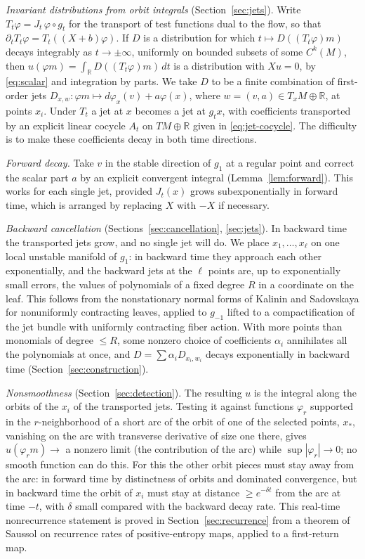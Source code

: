 \documentclass[11pt]{article}
\theoremstyle{remark}
\newcommand{\R}{\mathbb R}
\begin{document}
\emph{Invariant distributions from orbit integrals}
(Section~\ref{sec:jets}).  Write
\(T_t\varphi=J_t\,\varphi\circ g_t\) for the transport of test
functions dual to the flow, so that \(\partial_tT_t\varphi=T_t((X+b)\varphi)\).
If \(D\) is a distribution for which
\(t\mapsto D((T_t\varphi)m)\) decays integrably as \(t\to\pm\infty\),
uniformly on bounded subsets of some \(C^k(M)\), then
\(u(\varphi m)=\int_\R D((T_t\varphi)m)\,dt\) is a distribution with
\(Xu=0\), by \eqref{eq:scalar} and integration by parts.
We take \(D\) to be a finite combination of first-order jets
\(D_{x,w}:\varphi m\mapsto d\varphi_x(v)+a\varphi(x)\), where
\(w=(v,a)\in T_xM\oplus\R\), at points \(x_i\).
Under \(T_t\) a jet at \(x\) becomes a jet at \(g_tx\), with
coefficients transported by an explicit linear cocycle \(A_t\) on
\(TM\oplus\R\) given in \eqref{eq:jet-cocycle}.  The difficulty is
to make these coefficients decay in both time directions.

\emph{Forward decay.}  Take \(v\) in the stable direction of
\(g_1\) at a regular point and correct the scalar part \(a\)
by an explicit convergent integral (Lemma~\ref{lem:forward}).  This
works for each single jet, provided \(J_t(x)\) grows subexponentially
in forward time, which is arranged by replacing \(X\)
with \(-X\) if necessary.

\emph{Backward cancellation} (Sections~\ref{sec:cancellation},
\ref{sec:jets}).  In backward time the transported jets grow, and no
single jet will do.  We place \(x_1,\dots,x_\ell\) on one
local unstable manifold of \(g_1\): in backward time they approach
each other exponentially, and the backward jets at the \(\ell\)
points are, up to exponentially small errors, the values of
polynomials of a fixed degree \(R\) in a coordinate on the
leaf.  This follows from the nonstationary normal forms of
Kalinin and Sadovskaya \cite{KalininSadovskaya2017} for nonuniformly
contracting leaves, applied to \(g_{-1}\) lifted to a
compactification of the jet bundle with uniformly contracting fiber
action.  With more points than monomials of degree
\(\le R\), some nonzero choice of coefficients \(\alpha_i\) annihilates
all the polynomials at once, and \(D=\sum\alpha_iD_{x_i,w_i}\) decays
exponentially in backward time (Section~\ref{sec:construction}).

\emph{Nonsmoothness} (Section~\ref{sec:detection}).  The resulting
\(u\) is the integral along the orbits of the \(x_i\) of the
transported jets.  Testing it against functions \(\varphi_r\)
supported in the \(r\)-neighborhood of a short arc of the orbit of
one of the selected points, \(x_*\), vanishing on the arc with
transverse derivative of size one there, gives \(u(\varphi_rm)\to\)
a nonzero limit (the contribution of the arc) while
\(\sup|\varphi_r|\to0\); no smooth function can do this.  For this
the other orbit pieces must stay away from the arc:
in forward time by distinctness of orbits and dominated convergence,
but in backward time the orbit of \(x_i\) must stay at distance
\(\ge e^{-\delta t}\) from the arc at time \(-t\), with \(\delta\)
small compared with the backward decay rate.  This real-time
nonrecurrence statement is proved in Section~\ref{sec:recurrence}
from a theorem of Saussol \cite{Saussol2004} on recurrence rates of
positive-entropy maps, applied to a first-return map.
\end{document}
